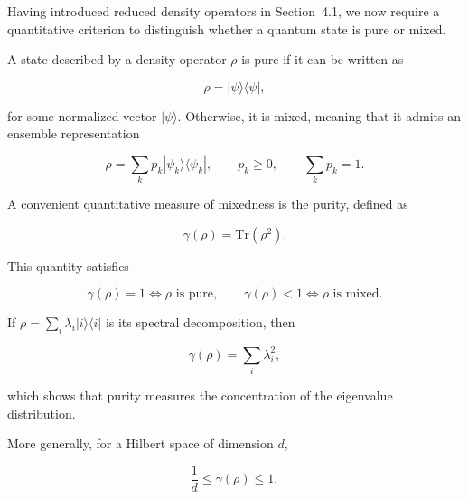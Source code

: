 Having introduced reduced density operators in Section~4.1, we now require a quantitative criterion to distinguish whether a quantum state is pure or mixed.

\medskip

A state described by a density operator \( \rho \) is pure if it can be written as

\begin{equation}
\rho
=
|\psi\rangle\langle\psi|,
\label{eq:pure_density_operator}
\end{equation}

for some normalized vector \( |\psi\rangle \). Otherwise, it is mixed, meaning that it admits an ensemble representation

\begin{equation}
\rho
=
\sum_k
p_k
|\psi_k\rangle\langle\psi_k|,
\qquad
p_k \ge 0,
\qquad
\sum_k p_k = 1.
\label{eq:mixed_density_operator}
\end{equation}

\medskip

A convenient quantitative measure of mixedness is the purity, defined as

\begin{equation}
\gamma(\rho)
=
\mathrm{Tr}(\rho^2).
\label{eq:purity_definition}
\end{equation}

This quantity satisfies

\begin{equation}
\gamma(\rho)=1
\Longleftrightarrow
\rho \text{ is pure},
\qquad
\gamma(\rho)<1
\Longleftrightarrow
\rho \text{ is mixed}.
\label{eq:purity_pure_mixed_condition}
\end{equation}

\medskip

If \( \rho = \sum_i \lambda_i |i\rangle\langle i| \) is its spectral decomposition, then

\begin{equation}
\gamma(\rho)
=
\sum_i \lambda_i^2,
\label{eq:purity_spectral_decomposition}
\end{equation}

which shows that purity measures the concentration of the eigenvalue distribution.

More generally, for a Hilbert space of dimension \( d \),

\begin{equation}
\frac{1}{d}
\le
\gamma(\rho)
\le
1,
\label{eq:purity_bounds}
\end{equation}

